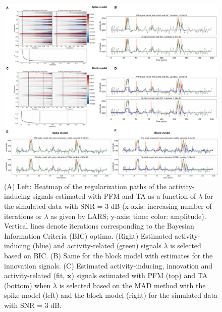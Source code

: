 \begin{figure}[t!]
    \begin{center}
        \includegraphics[width=\textwidth]{figures/figure_sim.pdf}
    \end{center}
    \caption{(A) Left: Heatmap of the regularization paths of the activity-inducing signals estimated with PFM and TA as a function of $\lambda$ for the simulated data with SNR = 3 dB (x-axis: increasing number of iterations or $\lambda$ as given by LARS; y-axis: time; color: amplitude). Vertical lines denote iterations corresponding to the Bayesian Information Criteria (BIC) optima. (Right) Estimated activity-inducing (blue) and activity-related (green) signals $\lambda$ is selected based on BIC. (B) Same for the block model with estimates for the innovation signals. (C) Estimated activity-inducing, innovation and activity-related (fit, $\mathbf{x}$) signals estimated with PFM (top) and TA (bottom) when $\lambda$ is selected based on the MAD method with the spike model (left) and the block model (right) for the simulated data with SNR = 3 dB.}
\label{fig:sim}
\end{figure}


